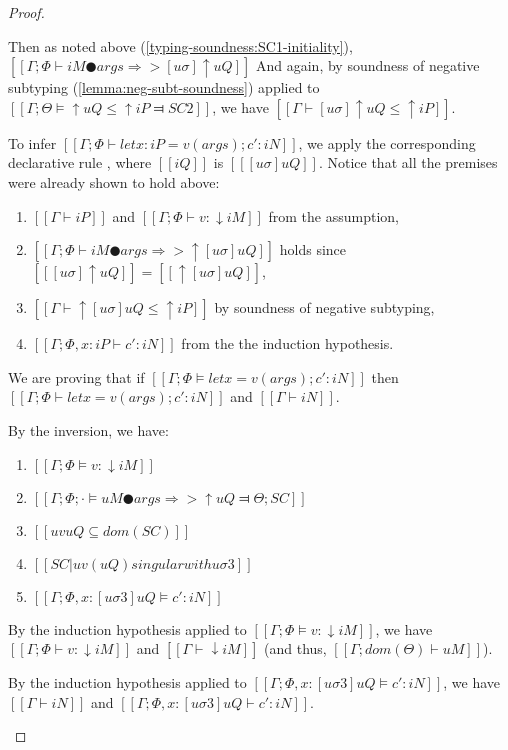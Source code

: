 \begin{proof}
\begin{caseof}
            Then as noted above (\ref{typing-soundness:SC1-initiality}),
            $[[ Γ ; Φ ⊢ iM ● args ⇒> [uσ]↑uQ ]]$
            And again, by soundness of negative subtyping (\cref{lemma:neg-subt-soundness})
            applied to $[[Γ; Θ ⊨ ↑uQ ≤ ↑iP ⫤ SC2]]$,
            we have
            $[[Γ ⊢ [uσ]↑uQ ≤ ↑iP]]$.

            To infer $[[Γ ; Φ ⊢ let x : iP = v(args); c' : iN ]]$,
            we apply the corresponding declarative rule , where
            $[[iQ]]$ is $[[ [uσ]uQ  ]]$. Notice that all the premises were already shown to
            hold above:
            \begin{enumerate}
                \item $[[Γ ⊢ iP]]$ and $[[Γ; Φ ⊢ v : ↓iM]]$ from the assumption,
                \item $[[Γ; Φ ⊢ iM ● args ⇒> ↑[uσ]uQ]]$ holds since $[[ [uσ]↑uQ ]] = [[ ↑[uσ]uQ ]]$,
                \item $[[Γ ⊢ ↑[uσ]uQ ≤ ↑iP]]$ by soundness of negative subtyping,
                \item $[[Γ; Φ, x:iP ⊢ c' : iN]]$ from the the induction hypothesis.
            \end{enumerate}

        \item {}
            We are proving that if
            $[[Γ; Φ ⊨ let x = v(args); c' : iN]]$
            then
            $[[Γ ; Φ ⊢ let x = v(args); c' : iN]]$ and
            $[[Γ ⊢ iN]]$.

            By the inversion, we have:
            \begin{enumerate}
                \item $[[Γ; Φ ⊨ v : ↓iM]]$ 
                \item $[[Γ ; Φ ; · ⊨ uM ● args ⇒> ↑uQ ⫤ Θ; SC]]$
                \item $[[uv uQ ⊆ dom(SC)]]$
                \item $[[SC|uv(uQ) singular with uσ3]]$
                \item $[[Γ; Φ, x:[uσ3]uQ ⊨ c' : iN]]$
            \end{enumerate}

            By the induction hypothesis applied to $[[Γ; Φ ⊨ v : ↓iM]]$, we have    
            $[[Γ; Φ ⊢ v : ↓iM]]$ and $[[Γ ⊢ ↓iM]]$ (and thus, $[[Γ ; dom(Θ) ⊢  uM]]$).
       
            By the induction hypothesis applied to $[[Γ; Φ, x:[uσ3]uQ ⊨ c' : iN]]$, we have
            $[[Γ ⊢ iN]]$ and $[[Γ; Φ, x:[uσ3]uQ ⊢ c' : iN]]$.


\end{caseof}
\end{proof}
